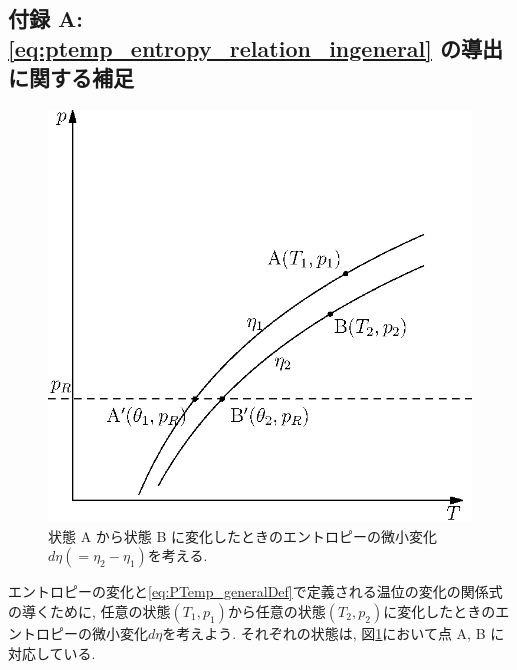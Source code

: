 \setcounter{page}{1}
\renewcommand{\thepage}{\arabic{page}}

\subsection*{付録 A: \eqref{eq:ptemp_entropy_relation_ingeneral} の導出に関する補足}
\begin{figure}
\includegraphics[width=\linewidth]{./appendix_Fig1}
\caption{\footnotesize 状態 A から状態 B に変化したときのエントロピーの微小変化$d\eta (= \eta_2-\eta_1)$を考える.}
\label{fig:appendix_Fig1}
\end{figure}
エントロピーの変化と\eqref{eq:PTemp_generalDef}で定義される温位の変化の関係式の導くために, 
任意の状態$(T_1,p_1)$から任意の状態$(T_2,p_2)$に変化したときのエントロピーの微小変化$d\eta$を考えよう.
それぞれの状態は, 図\ref{fig:appendix_Fig1}において点 A, B に対応している. 

